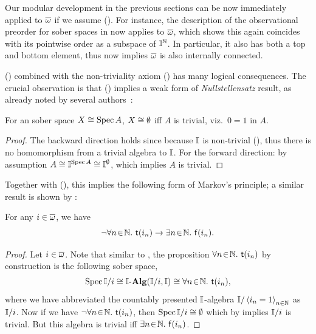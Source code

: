 \PrintAxiomSQCC

\begin{remark}
  Our modular development in the previous sections can be now immediately applied to $\overline{\omega}$ if we assume (\AxiomSQCC). For instance, the description of the observational preorder for sober spaces in  now applies to $\overline{\omega}$, which shows this again coincides with its pointwise order as a subspace of $\mathbb{I}^{\mathbb{N}}$. In particular, it also has both a top and bottom element, thus  now implies $\overline{\omega}$ is also internally connected. 
\end{remark}

(\AxiomSQCC) combined with the non-triviality axiom (\AxiomNT) has many logical consequences. The crucial observation is that (\AxiomNT) implies a weak form of \emph{Nullstellensatz} result, as already noted by several authors~\citep{blechschmidt:2017,blechschmidt_general_2020,Cherubini_Coquand_Hutzler_2024}:

\begin{lemma}[\AxiomNT]\label{lem:nulls}
  For an sober space $X \cong \operatorname{Spec} A$, $X \cong \emptyset$ iff $A$ is trivial, viz.\ $0=1$ in $A$.
\end{lemma}
\begin{proof}
  The backward direction holds since because $\mathbb{I}$ is non-trivial (\AxiomNT), thus there is no homomorphism from a trivial algebra to $\mathbb{I}$. For the forward direction: by assumption $A \cong \mathbb{I}^{\operatorname{Spec} A} \cong \mathbb{I}^\emptyset$, which implies $A$ is trivial. 
\end{proof}

Together with (\AxiomSQCC), this implies the following form of Markov's principle; a similar result is shown by \citet{cherubini2024foundation}:

\begin{lemma}[\AxiomNT, \AxiomSQCC]\label{lem:markov}
  For any $i \in \overline{\omega}$, we have
  \[ \neg\forall n\!\in\!\mathbb{N}.\ \mathsf{t}(i_n) \to \exists n\!\in\!\mathbb{N}.\ \mathsf{f}(i_n)\text{.} \]
\end{lemma}
\begin{proof}
  Let $i \in \overline{\omega}$. Note that similar to , the proposition $\forall n\!\in\!\mathbb{N}.\  \mathsf{t}(i_n)$ by construction is the following sober space, 
  \[ \operatorname{Spec}\mathbb{I}/i \cong \mathbb{I}\text{-}\mathbf{Alg}(\mathbb{I}/i,\mathbb{I}) \cong \forall n\!\in\!\mathbb{N}.\  \mathsf{t}(i_n)\text{,} \]
  where we have abbreviated the countably presented $\mathbb{I}$-algebra $\mathbb{I}/\left\langle i_n=1\right\rangle_{n\in\mathbb{N}}$ as $\mathbb{I}/i$. Now if we have $\neg\forall n\!\in\!\mathbb{N}.\  \mathsf{t}(i_n)$, then $\operatorname{Spec}\mathbb{I}/i \cong \emptyset$ which by  implies $\mathbb{I}/i$ is trivial. But this algebra is trivial iff $\exists n\!\in\!\mathbb{N}.\  \mathsf{f}(i_n)$.
\end{proof}

